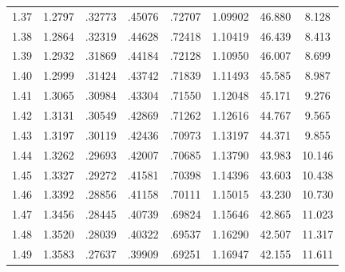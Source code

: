 \begin{minipage}{0.49\textwidth}
{\begin{tabular}{c|c|c|c|c|c|c|c}
        1.37 & 1.2797 & .32773 & .45076 & .72707 & 1.09902 & 46.880 & 8.128 \\
        1.38 & 1.2864 & .32319 & .44628 & .72418 & 1.10419 & 46.439 & 8.413 \\
        1.39 & 1.2932 & .31869 & .44184 & .72128 & 1.10950 & 46.007 & 8.699 \\
        1.40 & 1.2999 & .31424 & .43742 & .71839 & 1.11493 & 45.585 & 8.987 \\
        1.41 & 1.3065 & .30984 & .43304 & .71550 & 1.12048 & 45.171 & 9.276 \\
        1.42 & 1.3131 & .30549 & .42869 & .71262 & 1.12616 & 44.767 & 9.565 \\
        1.43 & 1.3197 & .30119 & .42436 & .70973 & 1.13197 & 44.371 & 9.855 \\
        1.44 & 1.3262 & .29693 & .42007 & .70685 & 1.13790 & 43.983 & 10.146 \\
        1.45 & 1.3327 & .29272 & .41581 & .70398 & 1.14396 & 43.603 & 10.438 \\
        1.46 & 1.3392 & .28856 & .41158 & .70111 & 1.15015 & 43.230 & 10.730 \\
        1.47 & 1.3456 & .28445 & .40739 & .69824 & 1.15646 & 42.865 & 11.023 \\
        1.48 & 1.3520 & .28039 & .40322 & .69537 & 1.16290 & 42.507 & 11.317 \\
        1.49 & 1.3583 & .27637 & .39909 & .69251 & 1.16947 & 42.155 & 11.611 \\
    \end{tabular}
    }
\end{minipage}%
\hspace{-2mm}\vline\hspace{-3mm}
